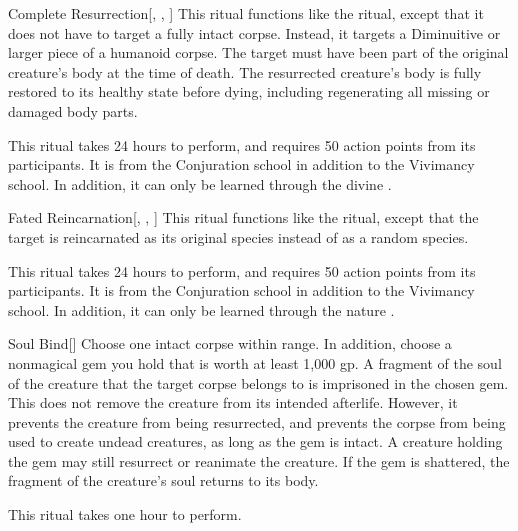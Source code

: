 \lowercase{\hypertarget{spell:Complete Resurrection}{}}\label{spell:Complete Resurrection}
\begin{freeability}[\nth{5}]{\hypertarget{spell:Complete Resurrection}{Complete Resurrection}}[, , ]
This ritual functions like the  ritual, except that it does not have to target a fully intact corpse.
Instead, it targets a Diminuitive or larger piece of a humanoid corpse.
The target must have been part of the original creature's body at the time of death.
The resurrected creature's body is fully restored to its healthy state before dying, including regenerating all missing or damaged body parts.

This ritual takes 24 hours to perform, and requires 50 action points from its participants.
It is from the Conjuration school in addition to the Vivimancy school.
In addition, it can only be learned through the divine .
\end{freeability}
\vspace{0.25em}



\lowercase{\hypertarget{spell:Fated Reincarnation}{}}\label{spell:Fated Reincarnation}
\begin{freeability}[\nth{5}]{\hypertarget{spell:Fated Reincarnation}{Fated Reincarnation}}[, , ]
This ritual functions like the  ritual, except that the target is reincarnated as its original species instead of as a random species.

This ritual takes 24 hours to perform, and requires 50 action points from its participants.
It is from the Conjuration school in addition to the Vivimancy school.
In addition, it can only be learned through the nature .
\end{freeability}
\vspace{0.25em}



\lowercase{\hypertarget{spell:Soul Bind}{}}\label{spell:Soul Bind}
\begin{freeability}[\nth{5}]{\hypertarget{spell:Soul Bind}{Soul Bind}}[]
Choose one intact corpse within \rngclose range.
In addition, choose a nonmagical gem you hold that is worth at least 1,000 gp.
A fragment of the soul of the creature that the target corpse belongs to is imprisoned in the chosen gem.
This does not remove the creature from its intended afterlife.
However, it prevents the creature from being resurrected, and prevents the corpse from being used to create undead creatures, as long as the gem is intact.
A creature holding the gem may still resurrect or reanimate the creature.
If the gem is shattered, the fragment of the creature's soul returns to its body.

This ritual takes one hour to perform.
\end{freeability}
\vspace{0.25em}




